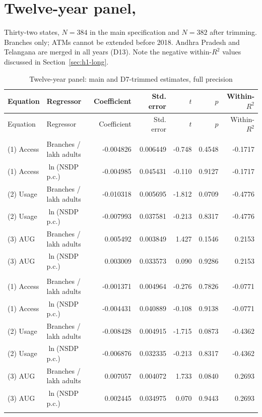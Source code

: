 \section{Twelve-year panel, \panelB{}}
\label{sec:app-12yr}

Thirty-two states, $N = 384$ in the main specification and $N = 382$ after trimming. Branches
only; ATMs cannot be extended before 2018. Andhra Pradesh and Telangana are merged in all
years (D13). Note the negative within-$R^2$ values discussed in Section~\ref{sec:h1-long}.

{\footnotesize
\begin{longtable}{@{}llrrrrr@{}}
\caption{Twelve-year panel: main and D7-trimmed estimates, full precision}
\label{tab:app-12yr}\\
\toprule
Equation & Regressor & Coefficient & Std. error & $t$ & $p$ & Within-$R^2$ \\
\midrule
\endfirsthead
\toprule
Equation & Regressor & Coefficient & Std. error & $t$ & $p$ & Within-$R^2$ \\
\midrule
\endhead
\bottomrule
\endlastfoot
\multicolumn{7}{@{}l}{\textbf{Twelve-year panel, main}} \\[2pt]
(1) Access & Branches / lakh adults & -0.004826 & 0.006449 & -0.748 & 0.4548 & -0.1717 \\
(1) Access & $\ln$(NSDP p.c.) & -0.004985 & 0.045431 & -0.110 & 0.9127 & -0.1717 \\
(2) Usage & Branches / lakh adults & -0.010318 & 0.005695 & -1.812 & 0.0709 & -0.4776 \\
(2) Usage & $\ln$(NSDP p.c.) & -0.007993 & 0.037581 & -0.213 & 0.8317 & -0.4776 \\
(3) AUG & Branches / lakh adults & 0.005492 & 0.003849 & 1.427 & 0.1546 & 0.2153 \\
(3) AUG & $\ln$(NSDP p.c.) & 0.003009 & 0.033573 & 0.090 & 0.9286 & 0.2153 \\
\addlinespace
\multicolumn{7}{@{}l}{\textbf{Twelve-year panel, D7-trimmed}} \\[2pt]
(1) Access & Branches / lakh adults & -0.001371 & 0.004964 & -0.276 & 0.7826 & -0.0771 \\
(1) Access & $\ln$(NSDP p.c.) & -0.004431 & 0.040889 & -0.108 & 0.9138 & -0.0771 \\
(2) Usage & Branches / lakh adults & -0.008428 & 0.004915 & -1.715 & 0.0873 & -0.4362 \\
(2) Usage & $\ln$(NSDP p.c.) & -0.006876 & 0.032335 & -0.213 & 0.8317 & -0.4362 \\
(3) AUG & Branches / lakh adults & 0.007057 & 0.004072 & 1.733 & 0.0840 & 0.2693 \\
(3) AUG & $\ln$(NSDP p.c.) & 0.002445 & 0.034975 & 0.070 & 0.9443 & 0.2693 \\
\addlinespace
\end{longtable}
}

